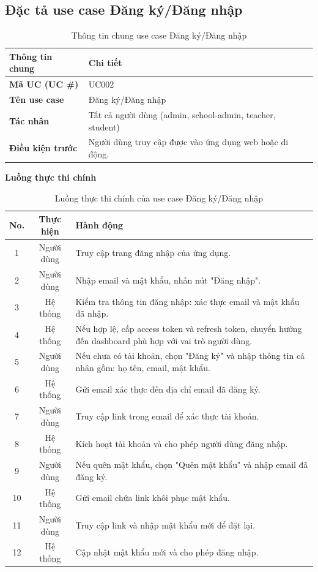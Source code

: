 ﻿\documentclass[../DoAn.tex]{subfiles}
\begin{document}
\subsection{Đặc tả use case Đăng ký/Đăng nhập}
\label{subsection:appendix:B.5}
\begin{table}[H]
\centering
\begin{tabular}{|p{4cm}|p{10cm}|}
\hline
\textbf{Thông tin chung} & \textbf{Chi tiết} \\ \hline
\textbf{Mã UC (UC \#)} & UC002 \\ \hline
\textbf{Tên use case} & Đăng ký/Đăng nhập \\ \hline
\textbf{Tác nhân} & Tất cả người dùng (admin, school-admin, teacher, student) \\ \hline
\textbf{Điều kiện trước} & Người dùng truy cập được vào ứng dụng web hoặc di động. \\ \hline
\end{tabular}
\caption{Thông tin chung use case Đăng ký/Đăng nhập}
\label{table:appendix:B.5_info}
\end{table}
\noindent\textbf{Luồng thực thi chính}
\begin{table}[H]
\centering
\begin{tabular}{|c|c|p{9cm}|}
\hline
\textbf{No.} & \textbf{Thực hiện} & \textbf{Hành động} \\ \hline
1 & Người dùng & Truy cập trang đăng nhập của ứng dụng. \\ \hline
2 & Người dùng & Nhập email và mật khẩu, nhấn nút "Đăng nhập". \\ \hline
3 & Hệ thống & Kiểm tra thông tin đăng nhập: xác thực email và mật khẩu đã nhập. \\ \hline
4 & Hệ thống & Nếu hợp lệ, cấp access token và refresh token, chuyển hướng đến dashboard phù hợp với vai trò người dùng. \\ \hline
5 & Người dùng & Nếu chưa có tài khoản, chọn "Đăng ký" và nhập thông tin cá nhân gồm: họ tên, email, mật khẩu. \\ \hline
6 & Hệ thống & Gửi email xác thực đến địa chỉ email đã đăng ký. \\ \hline
7 & Người dùng & Truy cập link trong email để xác thực tài khoản. \\ \hline
8 & Hệ thống & Kích hoạt tài khoản và cho phép người dùng đăng nhập. \\ \hline
9 & Người dùng & Nếu quên mật khẩu, chọn "Quên mật khẩu" và nhập email đã đăng ký. \\ \hline
10 & Hệ thống & Gửi email chứa link khôi phục mật khẩu. \\ \hline
11 & Người dùng & Truy cập link và nhập mật khẩu mới để đặt lại. \\ \hline
12 & Hệ thống & Cập nhật mật khẩu mới và cho phép đăng nhập. \\ \hline
\end{tabular}
\caption{Luồng thực thi chính của use case Đăng ký/Đăng nhập}
\label{table:appendix:B.5_main}
\end{table}
\end{document}
